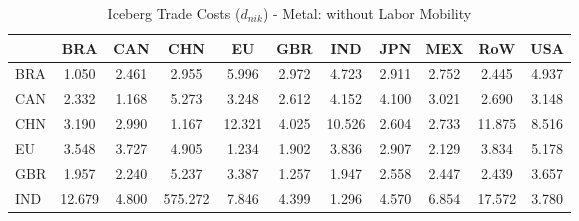 \begin{table}[htbp]
\centering
\caption{Iceberg Trade Costs ($d_{nik}$) - Metal: without Labor Mobility} 
\label{tab:iceberg_Metal}
\begin{tabular}{lcccccccccc}
  \hline
 & BRA & CAN & CHN & EU & GBR & IND & JPN & MEX & RoW & USA \\ 
  \hline
BRA & \textcolor[RGB]{252,163,3}{1.050} & \textcolor[RGB]{171,111,84}{2.461} & \textcolor[RGB]{128,82,128}{2.955} & \textcolor[RGB]{23,15,232}{5.996} & \textcolor[RGB]{125,81,130}{2.972} & \textcolor[RGB]{43,28,212}{4.723} & \textcolor[RGB]{133,86,122}{2.911} & \textcolor[RGB]{145,94,110}{2.752} & \textcolor[RGB]{178,115,76}{2.445} & \textcolor[RGB]{36,23,219}{4.937} \\ 
  CAN & \textcolor[RGB]{186,120,69}{2.332} & \textcolor[RGB]{242,157,13}{1.168} & \textcolor[RGB]{28,18,227}{5.273} & \textcolor[RGB]{99,64,156}{3.248} & \textcolor[RGB]{161,104,94}{2.612} & \textcolor[RGB]{51,33,204}{4.152} & \textcolor[RGB]{54,35,201}{4.100} & \textcolor[RGB]{120,78,135}{3.021} & \textcolor[RGB]{156,101,99}{2.690} & \textcolor[RGB]{105,68,150}{3.148} \\ 
  CHN & \textcolor[RGB]{102,66,153}{3.190} & \textcolor[RGB]{122,79,133}{2.990} & \textcolor[RGB]{245,158,10}{1.167} & \textcolor[RGB]{8,5,247}{12.321} & \textcolor[RGB]{59,38,196}{4.025} & \textcolor[RGB]{13,8,242}{10.526} & \textcolor[RGB]{163,106,92}{2.604} & \textcolor[RGB]{150,97,105}{2.733} & \textcolor[RGB]{10,7,245}{11.875} & \textcolor[RGB]{15,10,240}{8.516} \\ 
  EU & \textcolor[RGB]{87,56,168}{3.548} & \textcolor[RGB]{79,51,176}{3.727} & \textcolor[RGB]{38,25,217}{4.905} & \textcolor[RGB]{237,153,18}{1.234} & \textcolor[RGB]{217,140,38}{1.902} & \textcolor[RGB]{66,43,189}{3.836} & \textcolor[RGB]{135,87,120}{2.907} & \textcolor[RGB]{199,129,56}{2.129} & \textcolor[RGB]{69,45,186}{3.834} & \textcolor[RGB]{33,21,222}{5.178} \\ 
  GBR & \textcolor[RGB]{209,135,46}{1.957} & \textcolor[RGB]{191,124,64}{2.240} & \textcolor[RGB]{31,20,224}{5.237} & \textcolor[RGB]{94,61,161}{3.387} & \textcolor[RGB]{232,150,23}{1.257} & \textcolor[RGB]{212,137,43}{1.947} & \textcolor[RGB]{166,107,89}{2.558} & \textcolor[RGB]{176,114,79}{2.447} & \textcolor[RGB]{181,117,74}{2.439} & \textcolor[RGB]{82,53,173}{3.657} \\ 
  IND & \textcolor[RGB]{5,3,250}{12.679} & \textcolor[RGB]{41,26,214}{4.800} & \textcolor[RGB]{0,0,255}{575.272} & \textcolor[RGB]{18,12,237}{7.846} & \textcolor[RGB]{48,31,207}{4.399} & \textcolor[RGB]{230,148,26}{1.296} & \textcolor[RGB]{46,30,209}{4.570} & \textcolor[RGB]{20,13,235}{6.854} & \textcolor[RGB]{3,2,252}{17.572} & \textcolor[RGB]{71,46,184}{3.780} \\ 

\end{tabular}
\end{table}
